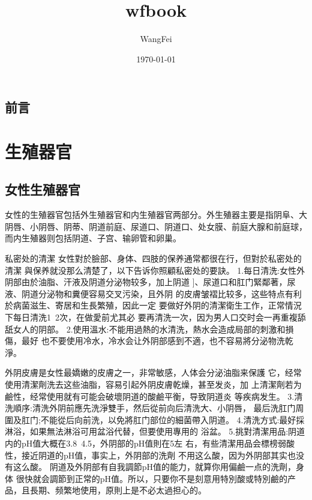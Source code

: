 \documentclass[12pt,UTF8]{ctexbook}
\title{\heiti\zihao{0} wfbook}
\author{WangFei}
\date{\today}
\begin{document}
\maketitle
\tableofcontents

\frontmatter

\chapter{前言}



\mainmatter

\part{生殖器官}

\chapter{女性生殖器官}

女性的生殖器官包括外生殖器官和内生殖器官两部分。外生殖器主要是指阴阜、大阴唇、小阴唇、阴蒂、阴道前庭、尿道口、阴道口、处女膜、前庭大腺和前庭球，而内生殖器则包括阴道、子宫、输卵管和卵巢。

私密处的清潔
女性對於臉部、身体、四肢的保养通常都很在行，但對於私密处的清潔
與保养就没那么清楚了，以下告诉你照顧私密处的要訣。
1.每日清洗:女性外阴部由於油脂、汗液及阴道分泌物较多，加上阴道
]、尿道口和肛门緊鄰著，尿液、阴道分泌物和糞便容易交叉污染，且外阴
的皮膚皱褶比较多，这些特点有利於病菌滋生、寄居和生長繁殖，因此一定
要做好外阴的清潔衛生工作，正常情況下每日清洗1~2次，在做愛前尤其必
要再清洗一次，因为男人口交时会一再重複舔舐女人的阴部。
2.使用溫水:不能用過熱的水清洗，熱水会造成局部的刺激和損傷，最好
也不要使用冷水，冷水会让外阴部感到不適，也不容易將分泌物洗乾淨。

外阴皮膚是女性最嬌嫩的皮膚之一，非常敏感，人体会分泌油脂来保護
它，经常使用清潔劑洗去这些油脂，容易引起外阴皮膚乾燥，甚至发炎，加
上清潔劑若为鹼性，经常使用就有可能会破壞阴道的酸鹼平衡，导致阴道炎
等疾病发生。
3.清洗順序:清洗外阴前應先洗淨雙手，然后從前向后清洗大、小阴唇，
最后洗肛门周圍及肛门;不能從后向前洗，以免將肛门部位的細菌帶入阴道。
4.清洗方式:最好採淋浴，如果無法淋浴可用盆浴代替，但要使用專用的
浴盆。
5.挑對清潔用品:阴道内的pH值大概在3.8~4.5，外阴部的pH值則在5左
右，有些清潔用品会標榜弱酸性，接近阴道的pH值，事实上，外阴部的洗劑
不用这么酸，因为外阴部其实也没有这么酸。
阴道及外阴部有自我調節pH值的能力，就算你用偏鹼一点的洗劑，身体
很快就会調節到正常的pH值。所以，只要你不是刻意用特別酸或特別鹼的产
品，且長期、频繁地使用，原則上是不必太過担心的。
\end{document}
